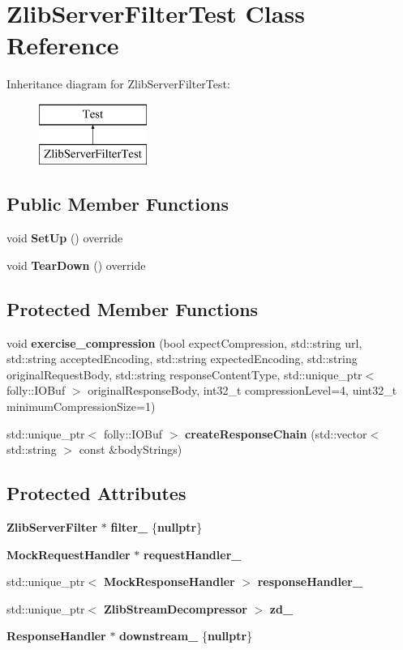 \section{Zlib\+Server\+Filter\+Test Class Reference}
\label{classZlibServerFilterTest}
Inheritance diagram for Zlib\+Server\+Filter\+Test\+:\begin{figure}[H]
\begin{center}
\leavevmode
\includegraphics[height=2.000000cm]{classZlibServerFilterTest}
\end{center}
\end{figure}
\subsection*{Public Member Functions}
\begin{DoxyCompactItemize}
\item 
void {\bf Set\+Up} () override
\item 
void {\bf Tear\+Down} () override
\end{DoxyCompactItemize}
\subsection*{Protected Member Functions}
\begin{DoxyCompactItemize}
\item 
void {\bf exercise\+\_\+compression} (bool expect\+Compression, std\+::string url, std\+::string accepted\+Encoding, std\+::string expected\+Encoding, std\+::string original\+Request\+Body, std\+::string response\+Content\+Type, std\+::unique\+\_\+ptr$<$ folly\+::\+I\+O\+Buf $>$ original\+Response\+Body, int32\+\_\+t compression\+Level=4, uint32\+\_\+t minimum\+Compression\+Size=1)
\item 
std\+::unique\+\_\+ptr$<$ folly\+::\+I\+O\+Buf $>$ {\bf create\+Response\+Chain} (std\+::vector$<$ std\+::string $>$ const \&body\+Strings)
\end{DoxyCompactItemize}
\subsection*{Protected Attributes}
\begin{DoxyCompactItemize}
\item 
{\bf Zlib\+Server\+Filter} $\ast$ {\bf filter\+\_\+} \{{\bf nullptr}\}
\item 
{\bf Mock\+Request\+Handler} $\ast$ {\bf request\+Handler\+\_\+}
\item 
std\+::unique\+\_\+ptr$<$ {\bf Mock\+Response\+Handler} $>$ {\bf response\+Handler\+\_\+}
\item 
std\+::unique\+\_\+ptr$<$ {\bf Zlib\+Stream\+Decompressor} $>$ {\bf zd\+\_\+}
\item 
{\bf Response\+Handler} $\ast$ {\bf downstream\+\_\+} \{{\bf nullptr}\}
\end{DoxyCompactItemize}


